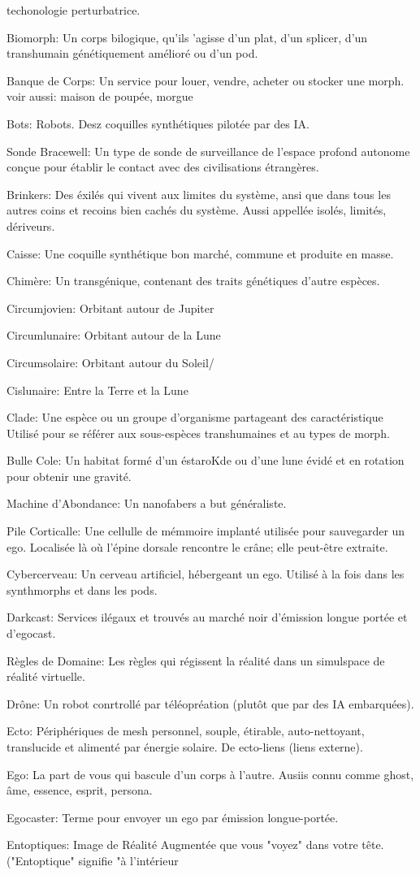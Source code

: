 techonologie perturbatrice. \item Biomorph: Un corps bilogique, qu'ils 'agisse d'un plat, d'un splicer, d'un transhumain génétiquement amélioré ou d'un pod. \item Banque de Corps: Un service pour louer, vendre, acheter  ou stocker une morph. voir aussi: maison de poupée, morgue \item Bots: Robots. Desz coquilles synthétiques pilotée par des IA. \item Sonde Bracewell: Un type de sonde de surveillance de l'espace profond autonome conçue pour établir le contact avec des civilisations étrangères. \item Brinkers: Des éxilés qui vivent aux limites du système, ansi que dans tous les autres coins et recoins bien cachés du système. Aussi appellée isolés, limités, dériveurs. \item Caisse: Une coquille synthétique bon marché, commune et produite en masse. \item Chimère: Un transgénique, contenant des traits génétiques d'autre espèces. \item Circumjovien: Orbitant autour de Jupiter \item Circumlunaire: Orbitant autour de la Lune \item Circumsolaire: Orbitant autour du Soleil/ \item Cislunaire: Entre la Terre et la Lune \item Clade: Une espèce ou un groupe d'organisme partageant des caractéristique Utilisé pour se référer aux sous-espèces transhumaines et au types de morph. \item Bulle Cole: Un habitat formé d'un éstaroKde ou d'une lune évidé et en rotation pour obtenir une gravité. \item Machine d'Abondance: Un nanofabers a but généraliste. \item Pile Corticalle: Une cellulle de mémmoire implanté utilisée pour sauvegarder un ego. Localisée là où l'épine dorsale rencontre le crâne; elle peut-être extraite. \item Cybercerveau: Un cerveau artificiel, hébergeant un ego. Utilisé à la fois dans les synthmorphs et dans les pods. \item Darkcast: Services ilégaux et trouvés au marché noir d'émission longue portée et d'egocast. \item Règles de Domaine: Les règles qui régissent la réalité dans un simulspace de réalité virtuelle. \item Drône: Un robot conrtrollé par téléopréation (plutôt que par des IA embarquées). \item Ecto: Périphériques de mesh personnel, souple, étirable, auto-nettoyant, translucide et alimenté par énergie solaire. De ecto-liens (liens externe). \item Ego: La part de vous qui bascule d'un corps à l'autre. Ausiis connu comme ghost, âme, essence, esprit, persona. \item Egocaster: Terme pour envoyer un ego par émission longue-portée. \item Entoptiques: Image de Réalité Augmentée que vous "voyez" dans votre tête. ("Entoptique" signifie "à l'intérieur 